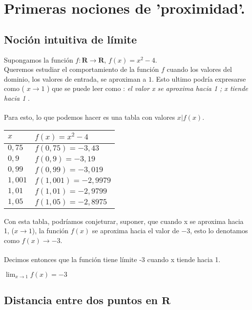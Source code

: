 \documentclass[11pt, a4paper]{article}
\begin{document}
\section{ Primeras nociones de 'proximidad'.  }

\subsection{ Noci\'on intuitiva de l\'imite }

Supongamos la funci\'on $ f: \mathbf{R} \to \mathbf{R} $, $ f(x) = x^2 - 4 $. \\  Queremos estudiar el {\color{blue} comportamiento} de la funci\'on $f$ cuando los valores del dominio, los valores de entrada, se aproximan a $1$. Esto ultimo podr\'ia expresarse como {\color{blue} ( $ x \to 1 $ )} que se puede leer como : 
\textit{ el valor x se aproxima hacia 1 ; x tiende hacia 1 }. \\ \\
Para esto, lo que podemos hacer es una tabla con valores $ x | f(x) $. \\
\begin{center}
\begin{tabular}{ | m | m | } 
  \hline
  $ x $ & $ f(x) = x^2 - 4 $  \\ 
  \hline
  $ 0,75 $ & $f(0,75) = -3,43$  \\ 
  \hline
  $ 0,9 $ & $f(0,9) = -3,19  $ \\
  \hline
  $ 0,99 $ & $f(0,99) = -3,019  $ \\
  \hline
  $ 1,001 $ & $f(1,001) = -2,9979  $ \\
  \hline
  $ 1,01 $ & $f(1,01) = -2,9799  $ \\
  \hline
  $ 1,05 $ & $f(1,05) = -2,8975  $ \\
  \hline
\end{tabular}
\end{center}
Con esta tabla, podr\'iamos {\color{blue} conjeturar}, suponer, que cuando x se aproxima hacia 1, {\color{blue} ($ x \to 1$)}, la funci\'on $f(x)$ se aproxima hacia el valor de $-3$, esto lo denotamos como {\color{blue}$ f(x) \to -3 $}. \\ \\ 
Decimos entonces que la funci\'on tiene l\'imite -3 cuando x tiende hacia 1. 

\begin{center}
$ \displaystyle \lim_{x \to 1} f(x) = -3  $
\end{center}

\subsection{ Distancia entre dos puntos en $\mathbf{R}$ }
\end{document}
